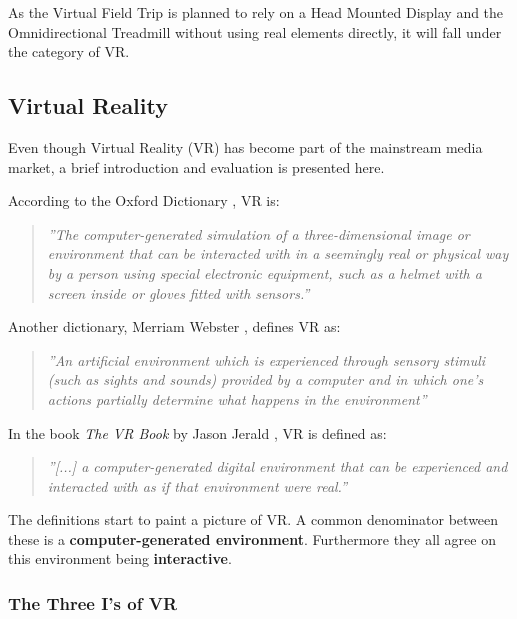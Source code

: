         As the Virtual Field Trip is planned to rely on a Head Mounted Display and the Omnidirectional Treadmill without using real elements directly, it will fall under the category of VR.
    
    \subsection{Virtual Reality}
        Even though Virtual Reality (VR) has become part of the mainstream media market, a brief introduction and evaluation is presented here.
        
        According to the Oxford Dictionary \cite{oxford}, VR is:
        
        \begin{quote}
            \textit{''The computer-generated simulation of a three-dimensional image or environment that can be interacted with in a seemingly real or physical way by a person using special electronic equipment, such as a helmet with a screen inside or gloves fitted with sensors.''}
        \end{quote}
        
        Another dictionary, Merriam Webster \cite{merrian_webster}, defines VR as:
        
        \begin{quote}
            \textit{''An artificial environment which is experienced through sensory stimuli (such as sights and sounds) provided by a computer and in which one's actions partially determine what happens in the environment''}
        \end{quote}
        
        In the book \emph{The VR Book} by Jason Jerald \cite{the_vr_book}, VR is defined as:
        
        \begin{quote}
            \textit{''[...] a computer-generated digital environment that can be experienced and interacted with as if that environment were real.''}
        \end{quote}
        
        The definitions start to paint a picture of VR. A common denominator between these is a \textbf{computer-generated environment}. Furthermore they all agree on this environment being \textbf{interactive}.
        
            \subsubsection{The Three I's of VR}
                \label{sec:threei}
            
